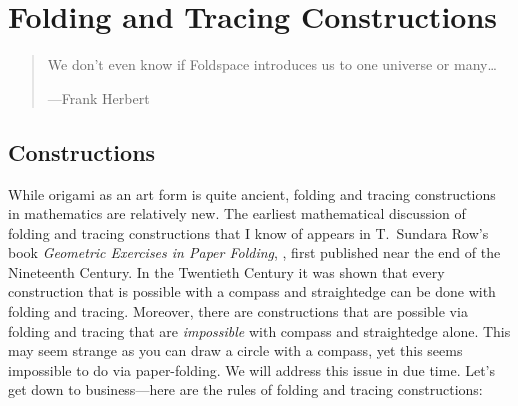 \chapter{Folding and Tracing Constructions}
\begin{quote} 
We don't even know if Foldspace introduces us to one universe or
many\dots

\hfill---Frank Herbert
\end{quote}

\section{Constructions}

While origami as an art form is quite ancient, folding and tracing constructions
in mathematics are relatively new. The earliest mathematical
discussion of folding and tracing constructions that I know of appears in
T.\ Sundara Row's book \textit{Geometric Exercises in Paper Folding},
\cite{row}, first published near the end of the Nineteenth Century. In
the Twentieth Century it was shown that every construction that is
possible with a compass and straightedge can be done with
folding and tracing. Moreover, there are constructions that are possible via
folding and tracing that are \textit{impossible} with compass and straightedge
alone. This may seem strange as you can draw a circle with a compass,
yet this seems impossible to do via paper-folding. We will address
this issue in due time. Let's get down to business---here are the
rules of folding and tracing constructions:


